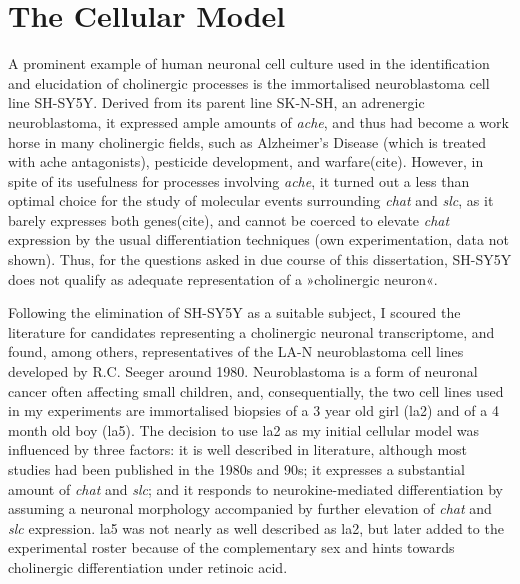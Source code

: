 \section{The Cellular Model}
A prominent example of human neuronal cell culture used in the identification and elucidation of cholinergic processes is the immortalised neuroblastoma cell line SH-SY5Y\cite{Biedler1978}. Derived from its parent line SK-N-SH, an adrenergic neuroblastoma\cite{Biedler1973}, it expressed ample amounts of \textit{\ac{ache}}, and thus had become a work horse in many cholinergic fields, such as Alzheimer's Disease (which is treated with \ac{ache} antagonists), pesticide development, and warfare(cite). However, in spite of its usefulness for processes involving \textit{\ac{ache}}, it turned out a less than optimal choice for the study of molecular events surrounding \textit{\ac{chat}} and \textit{\ac{slc}}, as it barely expresses both genes(cite), and cannot be coerced to elevate \textit{\ac{chat}} expression by the usual differentiation techniques (own experimentation, data not shown). Thus, for the questions asked in due course of this dissertation, SH-SY5Y does not qualify as adequate representation of a »cholinergic neuron«.

Following the elimination of SH-SY5Y as a suitable subject, I scoured the literature for candidates representing a cholinergic neuronal transcriptome, and found, among others, representatives of the LA-N neuroblastoma cell lines developed by R.C. Seeger around 1980\cite{Seeger1977, Seeger1982}. Neuroblastoma is a form of neuronal cancer often affecting small children, and, consequentially, the two cell lines used in my experiments are immortalised biopsies of a 3 year old girl (\acs{la2}\cite{Seeger1977}) and of a 4 month old boy (\mbox{\acs{la5}}\cite{Seeger1982}). The decision to use \ac{la2} as my initial cellular model was influenced by three factors: it is well described in literature, although most studies had been published in the 1980s and 90s; it expresses a substantial amount of \textit{\ac{chat}} and \textit{\ac{slc}}; and it responds to neurokine-mediated differentiation by assuming a neuronal morphology accompanied by further elevation of \textit{\ac{chat}} and \textit{\ac{slc}} expression. \ac{la5} was not nearly as well described as \ac{la2}, but later added to the experimental roster because of the complementary sex and hints towards cholinergic differentiation under retinoic acid\cite{Hill1997}.

